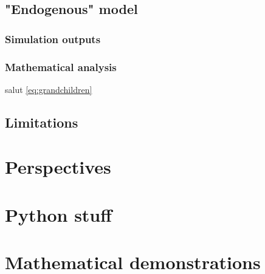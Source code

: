 \documentclass[a4paper,12pt]{report}
\begin{document}
\section{"Endogenous" model}

\subsection{Simulation outputs}

\subsection{Mathematical analysis}

salut
\ref{eq:grandchildren}



\section{Limitations}

\chapter{Perspectives}

%
%




\appendix

\chapter{Python stuff}
\label{a:scripts}
\chapter{Mathematical demonstrations}
\end{document}
